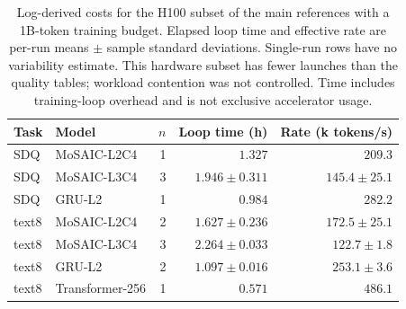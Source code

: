 \begin{table}[t]
\centering
\caption{Log-derived costs for the H100 subset of the main references with a 1B-token training budget. Elapsed loop time and effective rate are per-run means $\pm$ sample standard deviations. Single-run rows have no variability estimate. This hardware subset has fewer launches than the quality tables; workload contention was not controlled. Time includes training-loop overhead and is not exclusive accelerator usage.}
\label{tab:resources}
\begin{tabular}{llrrr}
\toprule
Task & Model & $n$ & Loop time (h) & Rate (k tokens/s) \\
\midrule
SDQ & MoSAIC-L2C4 & 1 & $1.327$ & $209.3$ \\
SDQ & MoSAIC-L3C4 & 3 & $1.946\pm0.311$ & $145.4\pm25.1$ \\
SDQ & GRU-L2 & 1 & $0.984$ & $282.2$ \\
text8 & MoSAIC-L2C4 & 2 & $1.627\pm0.236$ & $172.5\pm25.1$ \\
text8 & MoSAIC-L3C4 & 3 & $2.264\pm0.033$ & $122.7\pm1.8$ \\
text8 & GRU-L2 & 2 & $1.097\pm0.016$ & $253.1\pm3.6$ \\
text8 & Transformer-256 & 1 & $0.571$ & $486.1$ \\
\bottomrule
\end{tabular}
\end{table}
